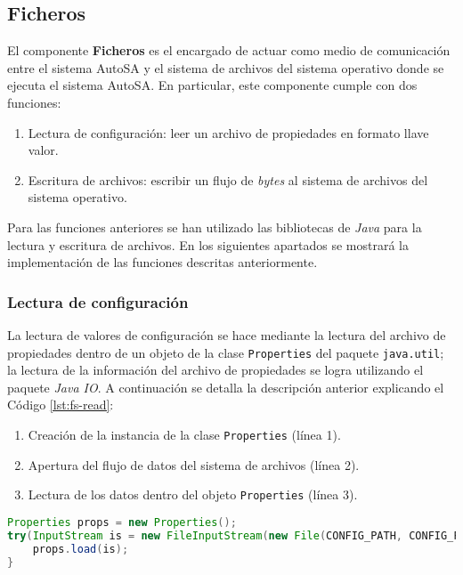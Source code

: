 \subsection{Ficheros}
El componente \textbf{Ficheros} es el encargado de actuar como medio de comunicación entre el sistema AutoSA y el sistema de archivos del sistema operativo donde se ejecuta el sistema AutoSA. En particular, este componente cumple con dos funciones:
\begin{enumerate}
	\item Lectura de configuración: leer un archivo de propiedades en formato llave valor.
	\item Escritura de archivos: escribir un flujo de \textit{bytes} al sistema de archivos del sistema operativo.
\end{enumerate}
Para las funciones anteriores se han utilizado las bibliotecas de \textit{Java} para la lectura y escritura de archivos. En los siguientes apartados se mostrará la implementación de las funciones descritas anteriormente.

\subsubsection{Lectura de configuración}
La lectura de valores de configuración se hace mediante la lectura del archivo de propiedades dentro de un objeto de la clase \texttt{Properties} del paquete \texttt{java.util}; la lectura de la información del archivo de propiedades se logra utilizando el paquete \textit{Java IO}. A continuación se detalla la descripción anterior explicando el Código \ref{lst:fs-read}:

\begin{enumerate}
 	\item Creación de la instancia de la clase \texttt{Properties} (línea 1).
 	\item Apertura del flujo de datos del sistema de archivos (línea 2).
 	\item Lectura de los datos dentro del objeto \texttt{Properties} (línea 3).
 \end{enumerate}

\begin{lstlisting}[language=Java, caption={Lectura de un archivo de propiedades.}, captionpos=b, label={lst:fs-read}]
Properties props = new Properties();
try(InputStream is = new FileInputStream(new File(CONFIG_PATH, CONFIG_FILENAME));){
	props.load(is);
}
\end{lstlisting}

